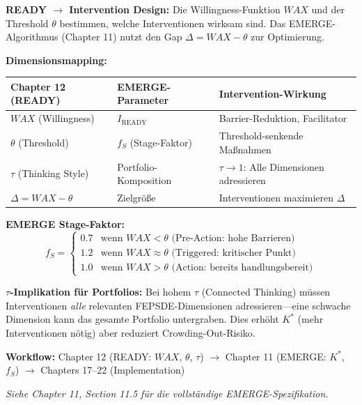\begin{tcolorbox}[
    colback=blue!5!white,
    colframe=blue!75!black,
    title={\textbf{Cross-Reference: EMERGE Algorithm (Chapter 11, EIT-EMP)}},
    fonttitle=\bfseries
]
\textbf{READY $\rightarrow$ Intervention Design:} Die Willingness-Funktion $WAX$ und der Threshold $\theta$ bestimmen, welche Interventionen wirksam sind. Das EMERGE-Algorithmus (Chapter 11) nutzt den Gap $\Delta = WAX - \theta$ zur Optimierung.

\medskip
\textbf{Dimensionsmapping:}
\begin{center}
\begin{tabular}{lll}
\textbf{Chapter 12 (READY)} & \textbf{EMERGE-Parameter} & \textbf{Intervention-Wirkung} \\
\midrule
$WAX$ (Willingness) & $I_{\text{READY}}$ & Barrier-Reduktion, Facilitator \\
$\theta$ (Threshold) & $f_S$ (Stage-Faktor) & Threshold-senkende Maßnahmen \\
$\tau$ (Thinking Style) & Portfolio-Komposition & $\tau \to 1$: Alle Dimensionen adressieren \\
$\Delta = WAX - \theta$ & Zielgröße & Interventionen maximieren $\Delta$ \\
\end{tabular}
\end{center}

\medskip
\textbf{EMERGE Stage-Faktor:}
\[
f_S = \begin{cases}
0.7 & \text{wenn } WAX < \theta \text{ (Pre-Action: hohe Barrieren)} \\
1.2 & \text{wenn } WAX \approx \theta \text{ (Triggered: kritischer Punkt)} \\
1.0 & \text{wenn } WAX > \theta \text{ (Action: bereits handlungsbereit)}
\end{cases}
\]

\medskip
\textbf{$\tau$-Implikation für Portfolios:}
Bei hohem $\tau$ (Connected Thinking) müssen Interventionen \emph{alle} relevanten FEPSDE-Dimensionen adressieren---eine schwache Dimension kann das gesamte Portfolio untergraben. Dies erhöht $K^*$ (mehr Interventionen nötig) aber reduziert Crowding-Out-Risiko.

\medskip
\textbf{Workflow:} Chapter 12 (READY: $WAX$, $\theta$, $\tau$) $\rightarrow$ Chapter 11 (EMERGE: $K^*$, $f_S$) $\rightarrow$ Chapters 17--22 (Implementation)

\medskip
\textit{Siehe Chapter 11, Section 11.5 für die vollständige EMERGE-Spezifikation.}
\end{tcolorbox}


